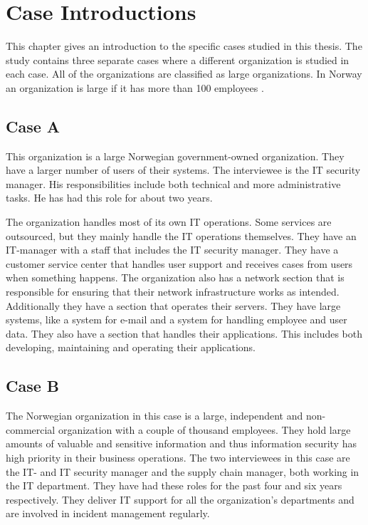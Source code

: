 \chapter{Case Introductions}
\label{chp:CaseIntroductions}
This chapter gives an introduction to the specific cases studied in this thesis. The study contains three separate cases where a different organization is studied in each case. All of the organizations are classified as large organizations. In Norway an organization is large if it has more than 100 employees \cite{SMB}.

\section{Case A}
This organization is a large Norwegian government-owned organization. They have a larger number of users of their systems. The interviewee is the IT security manager. His responsibilities include both technical and more administrative tasks. He has had this role for about two years.

The organization handles most of its own IT operations. Some services are outsourced, but they mainly handle the IT operations themselves. They have an IT-manager with a staff that includes the IT security manager. They have a customer service center %
that handles user support and receives cases from users when something happens. The organization also has a network section that is responsible for ensuring that their network infrastructure works as intended. Additionally they have a section that operates their servers. They have large systems, like a system for e-mail and a system for handling employee and user data. They also have a section that handles their applications. This includes both developing, maintaining and operating their applications.

\section{Case B}
The Norwegian organization in this case is a large, independent and non-commercial organization with a couple of thousand employees. They hold large amounts of valuable and sensitive information and thus information security has high priority in their business operations. The two interviewees in this case are the IT- and IT security manager and the supply chain manager, both working in the IT department. They have had these roles for the past four and six years respectively. They deliver IT support for all the organization's departments and are involved in incident management regularly.   

